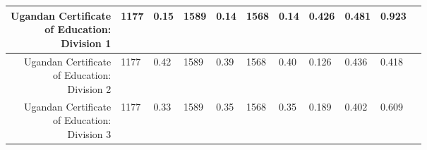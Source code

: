 \begin{longtable}{|r|l|l|l|l|l|l|l|l|l|l}
\hline

	 \makecell{Ugandan Certificate\\ of Education:\\ Division 1}                       & 1177                                                               &  0.15                                                              & 1589                                                               &  0.14                                                              & 1568                                                               &  0.14                                                              & 0.426                                                              & 0.481                                                              & 0.923                                                             \\

\hline

	 \makecell{Ugandan Certificate\\ of Education:\\ Division 2}                       & 1177                                                               &  0.42                                                              & 1589                                                               &  0.39                                                              & 1568                                                               &  0.40                                                              & 0.126                                                              & 0.436                                                              & 0.418                                                             \\

\hline

	 \makecell{Ugandan Certificate\\ of Education:\\ Division 3}                       & 1177                                                               &  0.33                                                              & 1589                                                               &  0.35                                                              & 1568                                                               &  0.35                                                              & 0.189                                                              & 0.402                                                              & 0.609                                                             \\


\end{longtable}
